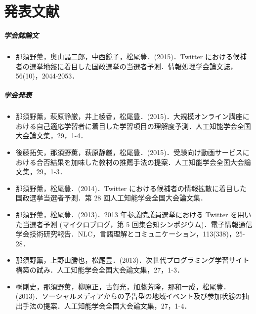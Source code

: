 \chapter*{発表文献}
\paragraph{学会誌論文}
\begin{itemize}
\item 那須野薫，奥山晶二郎，中西鏡子，松尾豊．(2015)．Twitter における候補者の選挙地盤に着目した国政選挙の当選者予測．情報処理学会論文誌，56(10)，2044-2053．
\end{itemize}
\paragraph{学会発表}
\begin{itemize}
\item 那須野薫，萩原静厳，井上綾香，松尾豊．(2015)．大規模オンライン講座における自己適応学習者に着目した学習項目の理解度予測．人工知能学会全国大会論文集，29，1-4．
\item 後藤拓矢，那須野薫，萩原静厳，松尾豊．(2015)．受験向け動画サービスにおける合否結果を加味した教材の推薦手法の提案．人工知能学会全国大会論文集，29，1-3．
\item 那須野薫，松尾豊．(2014)．Twitter における候補者の情報拡散に着目した国政選挙当選者予測．第 28 回人工知能学会全国大会論文集．
\item 那須野薫，松尾豊．(2013)．2013 年参議院議員選挙における Twitter を用いた当選者予測 (マイクロブログ，第 5 回集合知シンポジウム)．電子情報通信学会技術研究報告．NLC，言語理解とコミュニケーション，113(338)，25-28．
\item 那須野薫，上野山勝也，松尾豊．(2013)．次世代プログラミング学習サイト構築の試み．人工知能学会全国大会論文集，27，1-3．
\item 榊剛史，那須野薫，柳原正，古賀光，加藤芳隆，那和一成，松尾豊．(2013)．ソーシャルメディアからの予告型の地域イベント及び参加状態の抽出手法の提案．人工知能学会全国大会論文集，27，1-4．
\end{itemize}
